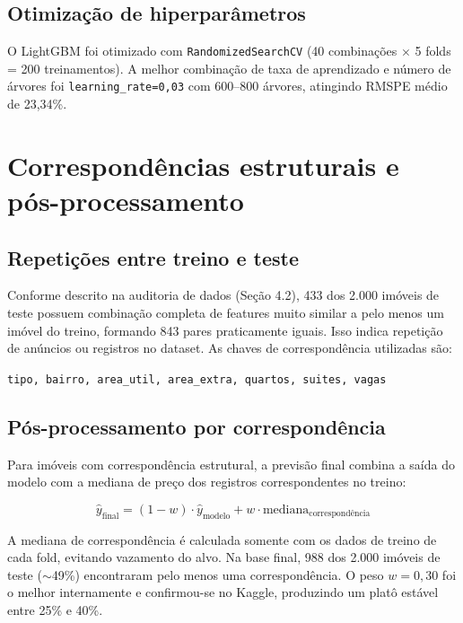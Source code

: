 \documentclass[12pt,a4paper]{article}
\begin{document}
\subsection{Otimização de hiperparâmetros}

O LightGBM foi otimizado com \lstinline{RandomizedSearchCV} (40 combinações $\times$ 5 folds = 200 treinamentos). A melhor combinação de taxa de aprendizado e número de árvores foi \lstinline{learning_rate=0,03} com 600--800 árvores, atingindo RMSPE médio de 23,34\%.

\section{Correspondências estruturais e pós-processamento}

\subsection{Repetições entre treino e teste}

Conforme descrito na auditoria de dados (Seção 4.2), 433 dos 2.000 imóveis de teste possuem combinação completa de features muito similar a pelo menos um imóvel do treino, formando 843 pares praticamente iguais. Isso indica repetição de anúncios ou registros no dataset. As chaves de correspondência utilizadas são:

\begin{center}
\texttt{tipo, bairro, area\_util, area\_extra, quartos, suites, vagas}
\end{center}

\subsection{Pós-processamento por correspondência}

Para imóveis com correspondência estrutural, a previsão final combina a saída do modelo com a mediana de preço dos registros correspondentes no treino:

\begin{equation}
\hat{y}_{\text{final}} = (1 - w) \cdot \hat{y}_{\text{modelo}} + w \cdot \text{mediana}_{\text{correspondência}}
\end{equation}

A mediana de correspondência é calculada somente com os dados de treino de cada fold, evitando vazamento do alvo. Na base final, 988 dos 2.000 imóveis de teste ($\sim$49\%) encontraram pelo menos uma correspondência. O peso $w = 0{,}30$ foi o melhor internamente e confirmou-se no Kaggle, produzindo um platô estável entre 25\% e 40\%.
\end{document}

